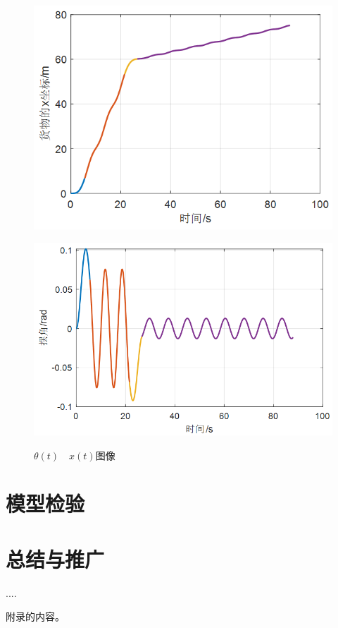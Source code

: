 \documentclass[withoutpreface,bwprint]{cumcmthesis} %
\begin{document}
\begin{figure}[!h]
    \centering
    \begin{minipage}[c]{0.48\textwidth}
        \centering
        \includegraphics[width=\textwidth]{p2x.png}
        \label{fig:sample-figure-a}
    \end{minipage}
    \begin{minipage}[c]{0.48\textwidth}
        \centering
        \includegraphics[width=\textwidth]{p2theta.png}
        \label{fig:sample-figure-b}
    \end{minipage}
    \caption{$\theta(t)\quad x(t)$图像}
    \label{fig:sample-figure}
\end{figure}

\section{模型检验}
\section{总结与推广}
\begin{thebibliography}{9}%
     ....
\end{thebibliography}
\begin{appendices}
    附录的内容。
\end{appendices}
\end{document}
